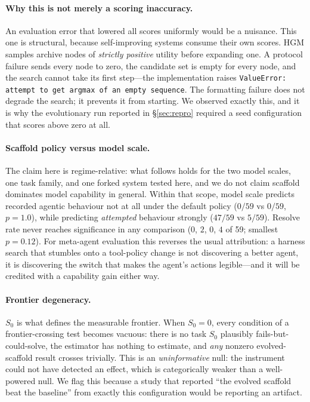 \documentclass{article}
\newcommand{\Sz}{\ensuremath{S_0}}
\begin{document}
\paragraph{Why this is not merely a scoring inaccuracy.}
An evaluation error that lowered all scores uniformly would be a nuisance.
This one is structural, because self-improving systems consume their own
scores. HGM samples archive nodes of \emph{strictly positive} utility before
expanding one. A protocol failure sends every node to zero, the candidate
set is empty for every node, and the search cannot take its first step---the
implementation raises \texttt{ValueError: attempt to get argmax of an empty
sequence}. The formatting failure does not degrade the search; it prevents
it from starting. We observed exactly this, and it is why the evolutionary
run reported in \S\ref{sec:repro} required a seed configuration that scores
above zero at all.

\paragraph{Scaffold policy versus model scale.}
The claim here is regime-relative: what follows holds for the
two model scales, one task family, and one forked system tested here, and we
do not claim scaffold dominates model capability in general. Within that
scope, model scale predicts recorded agentic behaviour not at all under the
default policy ($0/59$ vs $0/59$, $p = 1.0$), while predicting
\emph{attempted} behaviour strongly ($47/59$ vs $5/59$). Resolve rate never
reaches significance in any comparison ($0$, $2$, $0$, $4$ of 59; smallest
$p = 0.12$). For meta-agent evaluation this reverses the usual attribution:
a harness search that stumbles onto a tool-policy change is not discovering
a better agent, it is discovering the switch that makes the agent's actions
legible---and it will be credited with a capability gain either way.

\paragraph{Frontier degeneracy.}
\Sz{} is what defines the measurable frontier. When $\Sz{} = 0$, every condition
of a frontier-crossing test becomes vacuous: there is no task \Sz{} plausibly
fails-but-could-solve, the estimator has nothing to estimate, and \emph{any}
nonzero evolved-scaffold result crosses trivially. This is an
\emph{uninformative} null: the instrument could not have detected an
effect, which is categorically weaker than a well-powered null. We flag this
because a study that reported ``the evolved scaffold beat the baseline'' from
exactly this configuration would be reporting an artifact.
\end{document}
